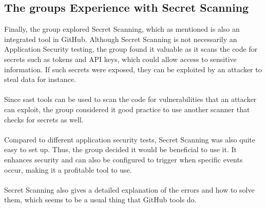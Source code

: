 \subsection{The groups Experience with Secret Scanning}
Finally, the group explored Secret Scanning, which as mentioned is also an integrated tool in GitHub. Although Secret Scanning is not necessarily an Application Security testing, the group found it valuable as it scans the code for secrets such as tokens and API keys, which could allow access to sensitive information. If such secrets were exposed, they can be exploited by an attacker to steal data for instance. 
\\~\\
Since \acrshort{sast} tools can be used to scan the code for vulnerabilities that an attacker can exploit, the group considered it good practice to use another scanner that checks for secrets as well. 
\\~\\
Compared to different application security tests, Secret Scanning was also quite easy to set up. Thus, the group decided it would be beneficial to use it. It enhances security and can also be configured to trigger when specific events occur, making it a profitable tool to use. 
\\~\\
Secret Scanning also gives a detailed explanation of the errors and how to solve them, which seems to be a usual thing that GitHub tools do. 

